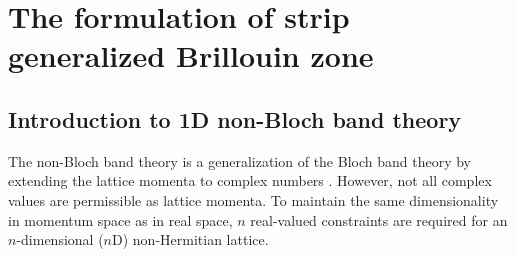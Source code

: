 

\def\rmd{\mathrm{d}}%
\def\rme{\mathrm{e}}%
\def\rmi{\mathrm{i}}%

\section{The formulation of strip generalized Brillouin zone }

\subsection{Introduction to 1D non-Bloch band theory}

\label{subsec:GBZ-1D}

The non-Bloch band theory is a generalization of the Bloch band theory
by extending the lattice momenta to complex numbers \cite{yaoEdgeStatesTopological2018,yokomizoNonBlochBandTheory2019,yangNonHermitianBulkBoundaryCorrespondence2020}.
However, not all complex values are permissible as lattice momenta.
To maintain the same dimensionality in momentum space as in real space,
$n$ real-valued constraints are required for an $n$-dimensional
($n$D) non-Hermitian lattice.

